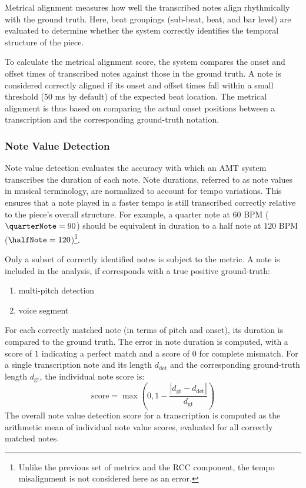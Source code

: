 Metrical alignment measures how well the transcribed notes align rhythmically with the ground truth. Here, beat groupings (sub-beat, beat, and bar level) are evaluated to determine whether the system correctly identifies the temporal structure of the piece.

To calculate the metrical alignment score, the system compares the onset and offset times of transcribed notes against those in the ground truth. A note is considered correctly aligned if its onset and offset times fall within a small threshold ($50$ ms by default) of the expected beat location. The metrical alignment is thus based on comparing the actual onset positions between a transcription and the corresponding ground-truth notation.

\subsubsection{Note Value Detection}

Note value detection evaluates the accuracy with which an AMT system transcribes the duration of each note. Note durations, referred to as note values in musical terminology, are normalized to account for tempo variations. This ensures that a note played in a faster tempo is still transcribed correctly relative to the piece's overall structure. For example, a quarter note at $60$ BPM ($\quarterNote = 90$) should be equivalent in duration to a half note at $120$ BPM ($\halfNote = 120$)\footnote{Unlike the previous set of metrics and the RCC component, the tempo misalignment is not considered here as an error.}.

Only a subset of correctly identified notes is subject to the metric. A note is included in the analysis, if corresponds with a true positive ground-truth: \begin{enumerate}
	\item multi-pitch detection
	\item voice segment
\end{enumerate}

For each correctly matched note (in terms of pitch and onset), its duration is compared to the ground truth. The error in note duration is computed, with a score of $1$ indicating a perfect match and a score of $0$ for complete mismatch. For a single transcription note and its length $d_{\textrm{det}}$ and the corresponding ground-truth length $d_{\textrm{gt}}$, the individual note score is: \[\textrm{score} = \max\left(0, 1 - \frac{\left|d_{\textrm{gt}} - d_{\textrm{det}}\right|}{d_{\textrm{gt}}}\right)\] The overall note value detection score for a transcription is computed as the arithmetic mean of individual note value scores, evaluated for all correctly matched notes. 

